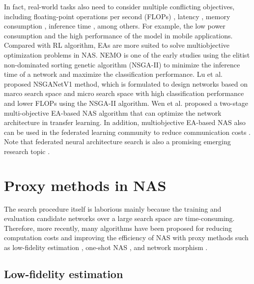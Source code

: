 \documentclass[journal]{IEEEtran}
\begin{document}
In fact, real-world tasks also need to consider multiple conflicting objectives, including floating-point operations per second (FLOPs) \cite{lu2019nsga, lu2020multi, lu2021neural}, latency \cite{guo2020single, lu2021neural}, memory consumption \cite{lu2021neural, elsken2018efficient}, inference time \cite{kim2017nemo}, among others. For example, the low power consumption and the high performance of the model in mobile applications. Compared with RL algorithm, EAs are more suited to solve multiobjective optimization problems in NAS. NEMO \cite{kim2017nemo} is one of the early studies using the elitist non-dominated sorting genetic algorithm (NSGA-II) \cite{deb2002fast} to minimize the inference time of a network and maximize the classification performance. Lu et al. \cite{lu2019nsga, lu2020multi} proposed NSGANetV1 method, which is formulated to design networks based on marco search space and micro search space with high classification performance and lower FLOPs using the NSGA-II algorithm. Wen et al. \cite{wen2021two} proposed a two-stage multi-objective EA-based NAS algorithm that can optimize the network architecture in transfer learning. In addition, multiobjective EA-based NAS also can be used in the federated learning community to reduce communication costs \cite{zhu2019multi, zhu2021real}. Note that federated neural architecture search is also a promising emerging research topic \cite{zhu2021federatednas}.

\section{Proxy methods in NAS}

The search procedure itself is laborious mainly because the training and evaluation candidate networks over a large search space are time-consuming. Therefore, more recently, many algorithms have been proposed for reducing computation costs and improving the efficiency of NAS with proxy methods such as low-fidelity estimation \cite{zhou2020econas, li2017hyperband, zhong2018practical, real2019aging, zhong2020blockqnn}, one-shot NAS \cite{zhang2020one, zhu2021real, zhang2022evolutionary}, and network morphism \cite{fang2020fna++, cai2019once}. 


\subsection{Low-fidelity estimation}
\end{document}
